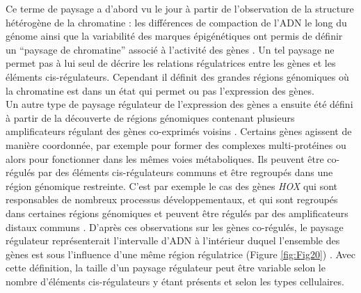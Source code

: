 Ce terme de paysage a d’abord vu le jour à partir de l’observation de la structure hétérogène de la chromatine : les différences de compaction de l’ADN le long du génome ainsi que la variabilité des marques épigénétiques ont permis de définir un “paysage de chromatine” associé à l’activité des gènes \citep{grewal_heterochromatin_2003}. Un tel paysage ne permet pas à lui seul de décrire les relations régulatrices entre les gènes et les éléments \gls{cis}-régulateurs. Cependant il définit des grandes régions génomiques où la chromatine est dans un état qui permet ou pas l’expression des gènes. \\

Un autre type de paysage régulateur de l’expression des gènes a ensuite été défini à partir de la découverte de régions génomiques contenant plusieurs \glspl{amplificateur} régulant des gènes co-exprimés voisins \citep{spitz_global_2003}. Certains gènes agissent de manière coordonnée, par exemple pour former des complexes multi-protéines ou alors pour fonctionner dans les mêmes voies métaboliques. Ils peuvent être co-régulés par des éléments \gls{cis}-régulateurs communs et être regroupés dans une région génomique restreinte. C’est par exemple le cas des gènes \textit{HOX} qui sont responsables de nombreux processus développementaux, et qui sont regroupés dans certaines régions génomiques et peuvent être régulés par des \glspl{amplificateur} distaux communs \citep{spitz_global_2008}. D’après ces observations sur les gènes co-régulés, le paysage régulateur représenterait l’intervalle d’ADN à l’intérieur duquel l'ensemble des gènes est sous l’influence d’une même région régulatrice (Figure \ref{fig:Fig20}) \citep{spitz_global_2003}. Avec cette définition, la taille d’un paysage régulateur peut être variable selon le nombre d’éléments \gls{cis}-régulateurs y étant présents et selon les types cellulaires. \\

